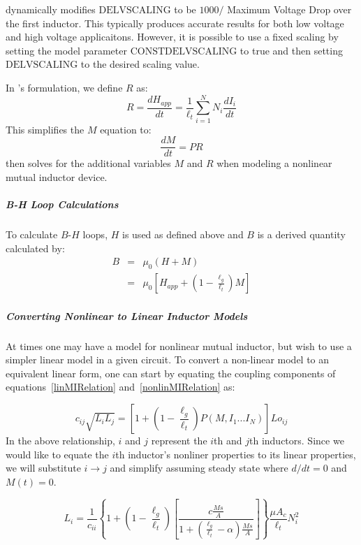 \Xyce\/ dynamically modifies $\mbox{DELVSCALING}$ to be $1000 / $ Maximum Voltage Drop over the 
first inductor.  This typically produces accurate results for both low voltage and high 
voltage applicaitons.  However, it is possible to use a fixed scaling by setting the 
model parameter $\mbox{CONSTDELVSCALING}$ to true and then setting $\mbox{DELVSCALING}$ 
to the desired scaling value.

In \Xyce{}'s formulation, we define $R$ as:
\begin{equation}
R = \frac{dH_{app}}{dt} = \frac{1}{\ell_t}\sum_{i=1}^{N} N_i \frac{dI_i}{dt}
\end{equation}
This simplifies the $M$ equation to:
\begin{equation}
\frac{dM}{dt} =  P R
\end{equation}
\Xyce{} then solves for the additional variables $M$ and $R$ when modeling a nonlinear
mutual inductor device.

\subparagraph{B-H Loop Calculations}
To calculate $B$-$H$ loops, $H$ is used as defined above and $B$ is a derived quantity
calculated by:
\begin{eqnarray}
B & = & \mu_0 \left( H + M \right) \\
  & = & \mu_0 \left[ H_{app} + \left(1 - \frac{\ell_g}{\ell_t}\right) M \right]
\end{eqnarray}

\subparagraph{Converting Nonlinear to Linear Inductor Models} 
At times one may have a model for nonlinear mutual inductor, but wish to use a 
simpler linear model in a given circuit.  To convert a non-linear model to an 
equivalent linear form, one can start by equating the coupling components of 
equations~\ref{linMIRelation} and~\ref{nonlinMIRelation} as:

\begin{equation}
 c_{ij} \sqrt{ L_{i} L_{j} } =  \left[1 + \left(1-\frac{\ell_g}{\ell_t}\right)P(M,I_{1} ... I_{N})\right] Lo_{ij}
\label{nonlinMIRelation2}
\end{equation}
In the above relationship, $i$ and $j$ represent the $i$th and $j$th inductors.  Since we would like to 
equate the $i$th inductor's nonliner properties to its linear properties, we will substitute $i\rightarrow j$ 
and simplify assuming steady state where $d/dt = 0$ and $M(t) = 0$.

\begin{equation}
L_{i} = \frac{1}{c_{ii}} \left\{ 1 + \left(1 - \frac{\ell_g}{\ell_t}  \right) 
  \left[\frac{c \frac{Ms}{A}}{1 + \left( \frac{\ell_g}{\ell_t} - \alpha\right) \frac{Ms}{A}} \right] \right\} \frac{\mu A_c}{\ell_t} N_i^2
  \label{inductanceFromWindings}
\end{equation}


